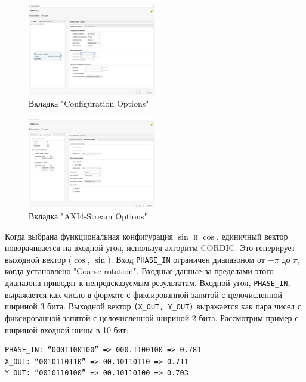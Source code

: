 \documentclass[a4paper,oneside ,14pt]{extreport}
\begin{document}
\begin{figure}[h]
	\centering
	\includegraphics[width=0.5\textwidth]{image/cordic_config_options.png}
	\caption{Вкладка "Configuration Options"}
	\label{cordic_config_options}
\end{figure}

\begin{figure}[h]
	\centering
	\includegraphics[width=0.5\textwidth]{image/cordic_axi4_stream_options.png}
	\caption{Вкладка "AXI4-Stream Options"}
	\label{cordic_axi4_stream_options}
\end{figure}

Когда выбрана функциональная конфигурация \(\sin\) и \(\cos\), единичный вектор поворачивается на входной угол, используя алгоритм CORDIC. Это генерирует выходной вектор (\(\cos\), \(\sin\)). Вход \verb|PHASE_IN| ограничен диапазоном от \(-\pi\) до \(\pi\), когда установлено "Coarse rotation". Входные данные за пределами этого диапазона приводят к непредсказуемым результатам. Входной угол, \verb|PHASE_IN|, выражается как число в формате с фиксированной запятой с целочисленной шириной 3 бита. Выходной вектор \verb|(X_OUT, Y_OUT)| выражается 
как пара чисел с фиксированной запятой с целочисленной шириной 2 бита.
Рассмотрим пример с шириной входной шины в 10 бит:

\begin{Verbatim}[tabsize=4]
PHASE_IN: “0001100100” => 000.1100100 => 0.781
X_OUT: “0010110110” => 00.10110110 => 0.711
Y_OUT: “0010110100” => 00.10110100 => 0.703
\end{Verbatim}
\end{document}
